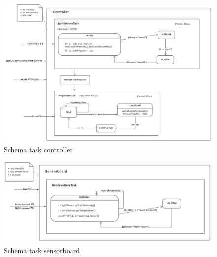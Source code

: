 \documentclass[a4paper, 12pt]{article}
\begin{document}
\begin{figure}[h]
    \includegraphics[scale=0.65]{controller_detail_smart_garden}
    \caption{Schema task controller}
\end{figure}

\begin{figure}[h]
    \includegraphics[scale=0.49]{sensorboard_detail_smart_garden}
    \caption{Schema task sensorboard}
\end{figure}
\end{document}
